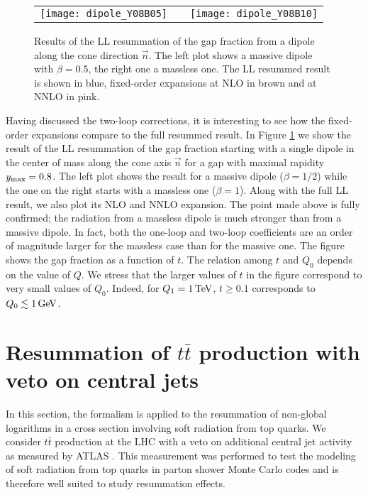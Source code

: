 \documentclass[11pt,a4paper]{article}
\begin{document}
\begin{figure}[t]
	\centering
	\begin{tabular}{ccc}
		\texttt{[image: dipole\_Y08B05]}	&& \texttt{[image: dipole\_Y08B10]}
	\end{tabular}
	\caption{Results of the LL resummation of the gap fraction from a dipole along the cone direction $\vec{n}$. The left plot shows a massive dipole with $\beta=0.5$, the right one a massless one. The LL resummed result is shown in blue,  fixed-order expansions at NLO in brown and at NNLO in pink. \label{fig:dipolesResummation}}
\end{figure}


Having discussed the two-loop corrections, it is interesting to see how the fixed-order expansions compare to the full resummed result. In Figure \ref{fig:dipolesResummation} we show the result of the LL resummation of the gap fraction starting with a single dipole in the center of mass along the cone axis $\vec{n}$ for a gap with maximal rapidity $y_{\rm max}=0.8$. The left plot shows the result for a massive dipole ($\beta=1/2$) while the one on the right starts with a massless one ($\beta=1$). Along with the full LL result, we also plot its NLO and NNLO expansion.  The point made above is fully confirmed; the radiation from a massless dipole is much stronger than from a massive dipole. In fact, both the one-loop and two-loop coefficients are an order of magnitude larger for the massless case than for the massive one. The figure shows the gap fraction as a function of $t$. The relation among $t$ and $Q_0$ depends on the value of $Q$. We stress that the larger values of $t$ in the figure correspond to very small values of $Q_0$. Indeed, for $Q_1= 1\,{\rm TeV}$, $t \geq 0.1$ corresponds to $Q_0 \lesssim 1\,{\rm GeV}$.
	
	

\section{\boldmath Resummation of $t\bar{t}$ production with veto on central jets \unboldmath} \label{sec:resummation}

In this section, the formalism is applied to the resummation of non-global logarithms in a cross section involving soft radiation from top quarks. We consider $t\bar{t}$ production at the LHC  with a veto on additional central jet activity as measured by ATLAS \cite{ATLAS:2012al}. This measurement was performed to test the modeling of soft radiation from top quarks in parton shower Monte Carlo codes and is therefore well suited to study resummation effects.
\end{document}

